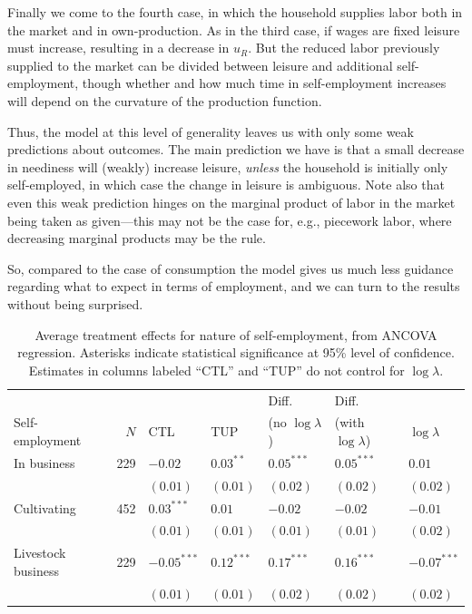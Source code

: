 \documentclass[11pt]{article}
\begin{document}
Finally we come to the fourth case, in which the household supplies
labor both in the market and in own-production.   As in the third case, if wages are
fixed leisure must increase, resulting in a decrease in $u_R$.  But
the reduced labor previously supplied to the market can be divided
between leisure and additional self-employment, though whether and how
much time in self-employment increases will depend on the curvature of
the production function.

Thus, the model at this level of generality leaves us with only some
weak predictions about outcomes.  The main prediction we
have is that a small decrease in neediness will (weakly) increase
leisure, \emph{unless} the household is initially only self-employed, in
which case the change in leisure is ambiguous.  Note also that even
this weak prediction hinges on the marginal product of labor in the
market being taken as given---this may not be the case for, e.g.,
piecework labor, where decreasing marginal products may be the rule.

So, compared to the case of consumption the model gives us much less
guidance regarding what to expect in terms of employment, and we can turn
to the results without being surprised.  

\begin{table}[htb]
\caption{\label{tab:employment}Average treatment effects for nature of self-employment, from ANCOVA regression. Asterisks indicate statistical significance at 95\% level of confidence.  Estimates in columns labeled ``CTL'' and ``TUP'' do not control for $\log\lambda$.}
\centering
\begin{tabular}{lrlllll}
 &  &  &  & Diff. & Diff. & \\
Self-employment & $N$ & CTL & TUP & (no $\log\lambda$) & (with $\log\lambda$) & $\log\lambda$\\
\hline
In business & 229 & $-0.02$ & $0.03^{**}$ & $0.05^{***}$ & $0.05^{***}$ & $0.01$\\
 &  & $(0.01)$ & $(0.01)$ & $(0.02)$ & $(0.02)$ & $(0.02)$\\
Cultivating & 452 & $0.03^{***}$ & $0.01$ & $-0.02$ & $-0.02$ & $-0.01$\\
 &  & $(0.01)$ & $(0.01)$ & $(0.01)$ & $(0.01)$ & $(0.02)$\\
Livestock business & 229 & $-0.05^{***}$ & $0.12^{***}$ & $0.17^{***}$ & $0.16^{***}$ & $-0.07^{***}$\\
 &  & $(0.01)$ & $(0.01)$ & $(0.02)$ & $(0.02)$ & $(0.02)$\\
\end{tabular}
\end{table}
\end{document}

